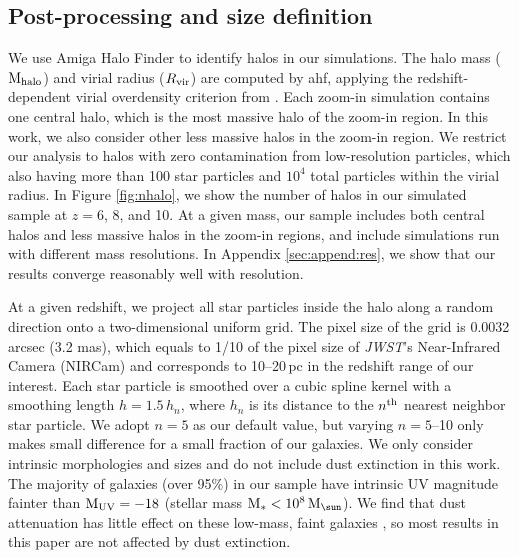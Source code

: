 \documentclass[useAMS,usenatbib]{mn2e}
\newcommand{\Rvir}{R_{\rm vir}}
\newcommand{\Mhalo}{{\rm M}_{\rm halo}}
\newcommand{\Ms}{{\rm M}_{\ast}}
\newcommand{\muv}{{\rm M_{UV}}}
\newcommand{\Msun}{{\rm M}_{\sun}}
\newcommand{\referee}[1]{{\color{black}#1}}
\begin{document}
\subsection{Post-processing and size definition}
\label{sec:definition}
We use Amiga Halo Finder \citep[{\sc ahf};][]{knollmann.knebe.2009:ahf.code} to identify halos in our simulations. The halo mass ($\Mhalo$) and virial radius ($\Rvir$) are computed by {\sc ahf}, applying the redshift-dependent virial overdensity criterion from \citet{bryan.norman.1998:xray.cluster}. Each zoom-in simulation contains one central halo, which is the most massive halo of the zoom-in region. In this work, we also consider other less massive halos in the zoom-in region. We restrict our analysis to halos with zero contamination from low-resolution particles, which also having more than 100 star particles and $10^4$ total particles within the virial radius. \referee{In Figure \ref{fig:nhalo}, we show the number of halos in our simulated sample at $z=6$, 8, and 10.} At a given mass, our sample includes both central halos and less massive halos in the zoom-in regions, and include simulations run with different mass resolutions. In Appendix \ref{sec:append:res}, we show that our results converge reasonably well with resolution.

At a given redshift, we project all star particles inside the halo along a random direction onto a two-dimensional uniform grid. The pixel size of the grid is 0.0032 arcsec (3.2 mas), which equals to 1/10 of the pixel size of {\it JWST}'s Near-Infrared Camera (NIRCam) and corresponds to 10--20\,pc in the redshift range of our interest. Each star particle is smoothed over a cubic spline kernel with a smoothing length $h=1.5\,h_n$, where $h_n$ is its distance to the $n^{\rm th}$ nearest neighbor star particle. We adopt $n=5$ as our default value, but varying $n=5$--10 only makes small difference for a small fraction of our galaxies. We only consider intrinsic morphologies and sizes and do not include dust extinction in this work. The majority of galaxies (over 95\%) in our sample have intrinsic UV magnitude fainter than $\muv=-18$ (stellar mass $\Ms<10^8\,\Msun$). We find that dust attenuation has little effect on these low-mass, faint galaxies \citep[also see][]{ma.2017:fire.hiz.smf}, so most results in this paper are not affected by dust extinction.
\end{document}

